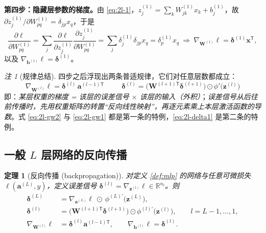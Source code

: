 \documentclass[UTF8,a4paper,11pt]{ctexart}
\theoremstyle{definition}
\theoremstyle{plain}
\newtheorem{theorem}[definition]{定理}
\theoremstyle{remark}
\newtheorem{remark}[definition]{注}
\newcommand{\R}{\mathbb{R}}
\newcommand{\T}{^{\mathsf{T}}}
\newcommand{\eng}[1]{\textup{(#1)}}
\begin{document}
\textbf{第四步：隐藏层参数的梯度。}由 \eqref{eq:2l-1}，$z^{(1)}_j=\sum_k W^{(1)}_{jk}x_k+b^{(1)}_j$，故 $\partial z^{(1)}_j/\partial W^{(1)}_{pq}=\delta_{jp}x_q$，于是
\begin{equation}\label{eq:2l-gw1}
  \frac{\partial\ell}{\partial W^{(1)}_{pq}}
  =\sum_{j}\frac{\partial\ell}{\partial z^{(1)}_j}\frac{\partial z^{(1)}_j}{\partial W^{(1)}_{pq}}
  =\sum_j\delta^{(1)}_j\delta_{jp}x_q=\delta^{(1)}_p x_q
  \ \Longrightarrow\ \nabla_{\bm{W}^{(1)}}\ell=\bm{\delta}^{(1)}\bm{x}\T,
\end{equation}
以及 $\nabla_{\bm{b}^{(1)}}\ell=\bm{\delta}^{(1)}$。

\begin{remark}[规律总结]
四步之后浮现出两条普适规律，它们对任意层数都成立：
\[
  \boxed{\ \nabla_{\bm{W}^{(l)}}\ell=\bm{\delta}^{(l)}\,\bm{a}^{(l-1)\mathsf{T}}\ }\qquad
  \boxed{\ \bm{\delta}^{(l)}=\big(\bm{W}^{(l+1)\mathsf{T}}\bm{\delta}^{(l+1)}\big)\odot\phi'\big(\bm{z}^{(l)}\big)\ }
\]
即：\emph{某层权重的梯度 = 该层的误差信号 $\times$ 该层的输入（外积）}；\emph{误差信号从后往前传播时，先用权重矩阵的转置“反向线性映射”，再逐元素乘上本层激活函数的导数}。式 \eqref{eq:2l-gw2} 与 \eqref{eq:2l-gw1} 都是第一条的特例，\eqref{eq:2l-delta1} 是第二条的特例。
\end{remark}

\subsection{一般 $L$ 层网络的反向传播}

\begin{theorem}[反向传播 \eng{backpropagation}]\label{thm:backprop}
对定义 \ref{def:mlp} 的网络与任意可微损失 $\ell(\bm{a}^{(L)},y)$，定义误差信号 $\bm{\delta}^{(l)}=\nabla_{\bm{z}^{(l)}}\ell\in\R^{n_l}$。则
\begin{align}
  \bm{\delta}^{(L)}&=\nabla_{\bm{a}^{(L)}}\ell\ \odot\ \phi^{(L)\prime}\big(\bm{z}^{(L)}\big), \label{eq:bp1}\\
  \bm{\delta}^{(l)}&=\Big(\bm{W}^{(l+1)\mathsf{T}}\bm{\delta}^{(l+1)}\Big)\odot\phi^{(l)\prime}\big(\bm{z}^{(l)}\big),
  \qquad l=L-1,\dots,1, \label{eq:bp2}\\
  \nabla_{\bm{W}^{(l)}}\ell&=\bm{\delta}^{(l)}\bm{a}^{(l-1)\mathsf{T}},
  \qquad
  \nabla_{\bm{b}^{(l)}}\ell=\bm{\delta}^{(l)} . \label{eq:bp3}
\end{align}
\end{theorem}
\end{document}
